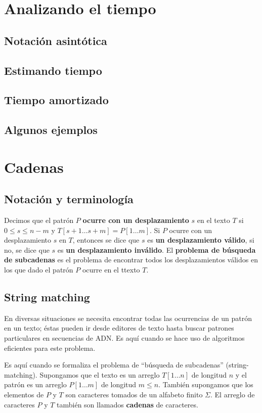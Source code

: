 \section{Analizando el tiempo}
\subsection{Notación asintótica}
\subsection{Estimando tiempo}
\subsection{Tiempo amortizado}
\subsection{Algunos ejemplos} %

\section{Cadenas}
\subsection{Notación y terminología}
Decimos que el patrón $P$ \textbf{ocurre con un desplazamiento} $s$ en el texto $T$ si
$0 \leq s \leq n - m$ y $T[s+1 \ldots s+m] = P[1 \ldots m]$. Si $P$ ocurre con un desplazamiento
$s$ en $T$, entonces se dice que $s$ es \textbf{un desplazamiento válido}, si no, se dice que $s$
es \textbf{un desplazamiento inválido}.
El \textbf{problema de búsqueda de subcadenas} es el problema de encontrar todos los
desplazamientos válidos en los que dado el patrón $P$ ocurre en el ttexto $T$.

\subsection{String matching} %
En diversas situaciones se necesita encontrar todas las ocurrencias de un patrón en un texto;
éstas pueden ir desde editores de texto hasta buscar patrones particulares en secuencias de ADN.
Es aquí cuando se hace uso de algoritmos eficientes para este problema.

Es aquí cuando se formaliza el problema de ``búsqueda de subcadenas'' (string-matching).
Supongamos que el texto es un arreglo $T[1 \ldots n]$ de longitud $n$ y el patrón es un arreglo
$P[1 \ldots m]$ de longitud $m \leq n$. También supongamos que los elementos de $P$ y $T$ son
caracteres tomados de un alfabeto finito $\Sigma$. El arreglo de caracteres $P$ y $T$ también son
llamados \textbf{cadenas} de caracteres.



